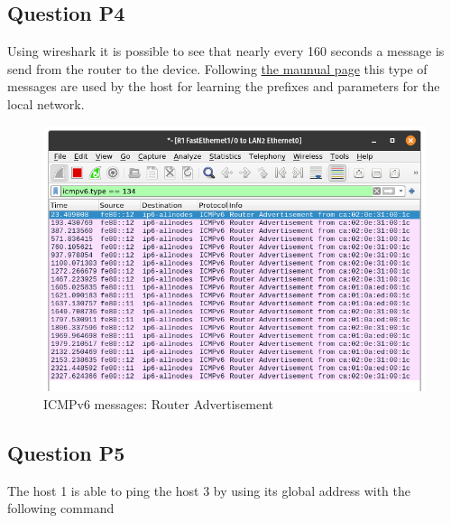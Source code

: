 \inputminted{text}{files/P3_H1_ipv6_addresses.txt}
\label{conf:ips_H1}

\inputminted{text}{files/P3_H2_ipv6_addresses.txt}
\label{conf:ips_H2}

\inputminted{text}{files/P3_H3_ipv6_addresses.txt}
\label{conf:ips_H3}

\subsection{Question P4}
Using wireshark it is possible to see that nearly every 160 seconds a  message is send from the router to the device. Following \href{https://www.cisco.com/assets/sol/sb/RV320_Emulators/RV320_Emulator_v1.0.1.01/help/DHCP7.html}{the maunual page} this type of messages are used by the host for learning the prefixes and parameters for the local network.

\begin{figure}[H]
	\centering
	\includegraphics[width=0.8\linewidth]{images/P4_ICMPv6_R_adv_croped.png}
	\caption{ICMPv6 messages: Router Advertisement}
	\label{fig:router_advertisement}
\end{figure}


\subsection{Question P5}
The host 1 is able to ping the host 3 by using its global address with the following command  

